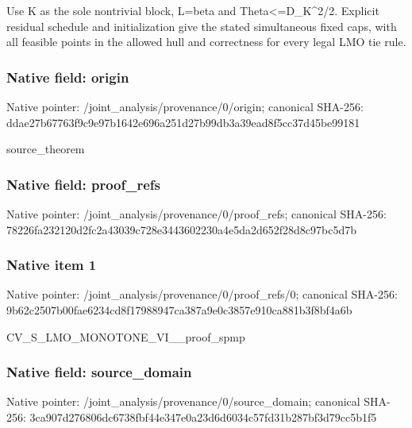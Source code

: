 \documentclass[10pt,a4paper]{article}
\begin{document}
\begingroup\raggedright\sloppy Use K as the sole nontrivial block,\allowbreak{} L=\allowbreak{}beta and Theta<=\allowbreak{}D\_\allowbreak{}K\textasciicircum{}2/\allowbreak{}2. Explicit residual schedule and initialization give the stated simultaneous fixed caps,\allowbreak{} with all feasible points in the allowed hull and correctness for every legal LMO tie rule.\par\endgroup

\subsubsection{Native field: origin}
Native pointer: /joint\_\allowbreak{}analysis/provenance/0/origin; canonical SHA-256: ddae27b67763f9c9e97b1642e696a251d27b99db3a39ead8f5cc37d45be99181

\begingroup\raggedright\sloppy source\_\allowbreak{}theorem\par\endgroup

\subsubsection{Native field: proof\_\allowbreak{}refs}
Native pointer: /joint\_\allowbreak{}analysis/provenance/0/proof\_\allowbreak{}refs; canonical SHA-256: 78226fa232120d2fc2a43039c728e3443602230a4e5da2d652f28d8c97bc5d7b

\subsubsection{Native item 1}
Native pointer: /joint\_\allowbreak{}analysis/provenance/0/proof\_\allowbreak{}refs/0; canonical SHA-256: 9b62c2507b00fae6234cd8f17988947ca387a9e0c3857e910ca881b3f8bf4a6b

\begingroup\raggedright\sloppy CV\_\allowbreak{}S\_\allowbreak{}LMO\_\allowbreak{}MONOTONE\_\allowbreak{}VI\_\allowbreak{}\_\allowbreak{}proof\_\allowbreak{}spmp\par\endgroup

\subsubsection{Native field: source\_\allowbreak{}domain}
Native pointer: /joint\_\allowbreak{}analysis/provenance/0/source\_\allowbreak{}domain; canonical SHA-256: 3ca907d276806dc6738fbf44e347e0a23d6d6034c57fd31b287bf3d79cc5b1f5
\end{document}
